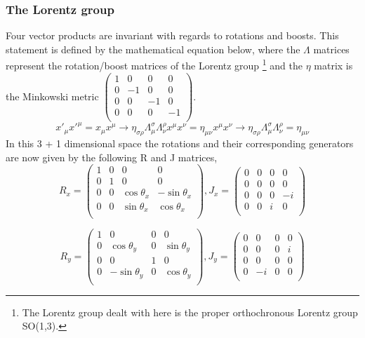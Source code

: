 \documentclass[12pt]{article}
\begin{document}
\subsubsection{The Lorentz group}
Four vector products are invariant with regards to rotations and boosts. This statement is defined by the mathematical equation below, where the $\Lambda$ matrices represent the rotation/boost matrices of the Lorentz group \footnote{The Lorentz group dealt with here is the proper orthochronous Lorentz group SO(1,3).} and the $\eta$ matrix is the Minkowski metric $\left( \begin{smallmatrix} 1 & 0 & 0 & 0 \\ 0 & -1 & 0 & 0 \\ 0 & 0 & -1 & 0 \\ 0 & 0 & 0 & -1 \\ \end{smallmatrix} \right)$.
\begin{equation}
\label{eq:lorentzinv}
x'_{\mu} x'^{\mu} = x_{\mu} x^{\mu} \rightarrow \eta_{\sigma\rho} \Lambda^{\sigma}_{\mu}  \Lambda^{\rho}_{\nu} x^{\mu} x^{\nu} = \eta_{\mu\nu} x^{\mu} x^{\nu}
\rightarrow \eta_{\sigma\rho} \Lambda^{\sigma}_{\mu}  \Lambda^{\rho}_{\nu} = \eta_{\mu\nu}
\end{equation}
In this 3 + 1 dimensional space the rotations and their corresponding generators are now given by the following R and J matrices, 
\begin{equation}
R_x = 
\begin{pmatrix}
1 & 0 & 0 & 0\\
0 & 1 & 0 & 0 \\
0 & 0 & \cos\theta_x & -\sin\theta_x \\
0 & 0 & \sin\theta_x & \cos\theta_x \\
\end{pmatrix},
J_x = 
\begin{pmatrix}
0 & 0 & 0 & 0\\
0 & 0 & 0 & 0 \\
0 & 0 & 0 & -i \\
0 & 0 & i & 0 \\
\end{pmatrix}
\end{equation}

\begin{equation}
R_y = 
\begin{pmatrix}
1 & 0 & 0 & 0\\
0 & \cos\theta_y & 0 & \sin\theta_y \\
0 & 0 & 1 & 0 \\
0 & -\sin\theta_y & 0 & \cos\theta_y \\
\end{pmatrix},
J_y = 
\begin{pmatrix}
0 & 0 & 0 & 0\\
0 & 0 & 0 & i \\
0 & 0 & 0 & 0 \\
0 & -i & 0 & 0 \\
\end{pmatrix}
\end{equation}
\end{document}
